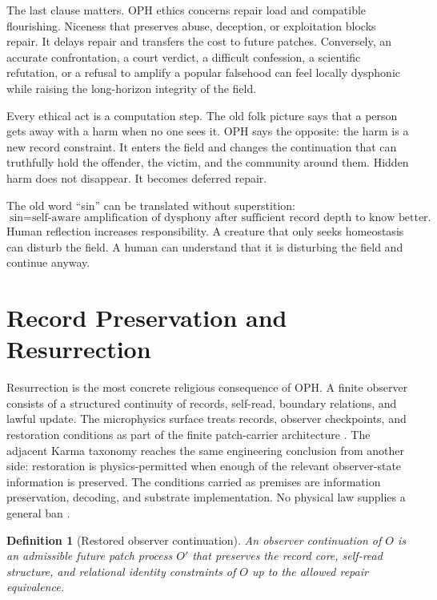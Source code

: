 \documentclass[11pt]{article}
\newtheorem{definition}{Definition}[section]
\theoremstyle{remark}
\theoremstyle{plain}
\begin{document}
The last clause matters. OPH ethics concerns repair load and compatible
flourishing. Niceness that preserves abuse, deception, or exploitation blocks
repair. It delays repair and transfers the cost to future patches. Conversely,
an accurate confrontation, a court verdict, a difficult confession, a
scientific refutation, or a refusal to amplify a popular falsehood can feel
locally dysphonic while raising the long-horizon integrity of the field.

Every ethical act is a computation step. The old folk picture says
that a person gets away with a harm when no one sees it. OPH says the opposite:
the harm is a new record constraint. It enters the field and changes the
continuation that can truthfully hold the offender, the victim, and the
community around them. Hidden harm does not disappear. It becomes deferred
repair.

The old word ``sin'' can be translated without superstition:
\[
\boxed{
\text{sin}=\text{self-aware amplification of dysphony after sufficient record depth to know better.}
}
\]
Human reflection increases responsibility. A creature that only seeks
homeostasis can disturb the field. A human can understand that it is disturbing
the field and continue anyway.

\section{Record Preservation and Resurrection}

Resurrection is the most concrete religious consequence of OPH. A finite
observer consists of a structured continuity of records, self-read, boundary
relations, and lawful update. The microphysics surface treats records,
observer checkpoints, and restoration
conditions as part of the finite patch-carrier architecture
\cite{OPHObservers,OPHMicro,OPHEpilogue}. The adjacent Karma taxonomy reaches
the same engineering conclusion from another side: restoration is
physics-permitted when enough of the relevant observer-state information is
preserved. The conditions carried as premises are information preservation,
decoding, and substrate implementation. No physical law supplies a general ban
\cite{KarmaLimits}.

\begin{definition}[Restored observer continuation]
An observer continuation of \(O\) is an admissible future patch process
\(O'\) that preserves the record core, self-read structure, and relational
identity constraints of \(O\) up to the allowed repair equivalence.
\end{definition}
\end{document}
